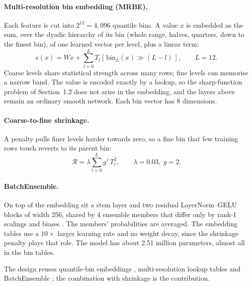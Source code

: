 \documentclass[11pt,a4paper]{article}
\begin{document}
\paragraph{Multi-resolution bin embedding (MRBE).} Each feature is cut into $2^{12}=4{,}096$ quantile bins. A value $x$ is embedded as the sum, over the dyadic hierarchy of its bin (whole range, halves, quarters, down to the finest bin), of one learned vector per level, plus a linear term:
\begin{equation}
  e(x) = W x + \sum_{l=0}^{L} T_l\!\left[\, \mathrm{bin}_L(x) \gg (L-l) \,\right], \qquad L = 12 .
\end{equation}
Coarse levels share statistical strength across many rows; fine levels can memorise a narrow band. The value is encoded exactly by a lookup, so the sharp-function problem of Section~1.2 does not arise in the embedding, and the layers above remain an ordinary smooth network. Each bin vector has 8 dimensions.

\paragraph{Coarse-to-fine shrinkage.} A penalty pulls finer levels harder towards zero, so a fine bin that few training rows touch reverts to its parent bin:
\begin{equation}
  \mathcal{R} = \lambda \sum_{l=0}^{L} g^{\,l}\, \overline{T_l^{2}}, \qquad \lambda = 0.03,\; g = 2 .
\end{equation}

\paragraph{BatchEnsemble.} On top of the embedding sit a stem layer and two residual LayerNorm--GELU blocks of width 256, shared by 4 ensemble members that differ only by rank-1 scalings and biases \cite{wen2020batchensemble}. The members' probabilities are averaged. The embedding tables use a $10\times$ larger learning rate and no weight decay, since the shrinkage penalty plays that role. The model has about 2.51 million parameters, almost all in the bin tables.

The design reuses quantile-bin embeddings \cite{gorishniy2022embeddings}, multi-resolution lookup tables \cite{muller2022instant} and BatchEnsemble \cite{wen2020batchensemble,gorishniy2025tabm}; the combination with shrinkage is the contribution.
\end{document}
